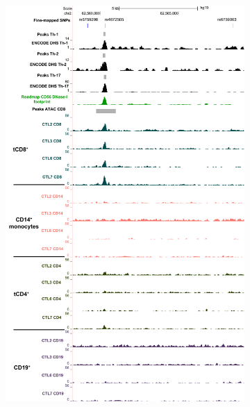 \begin{figure}[htbp]
\centering
\begin{subfigure}{0.5\textwidth}
\centering
\includegraphics[width=\textwidth]{./Results2/pdfs/chr2p15_rs4672505_FM_all_cell_types_track_all_marks}
\caption{\textbf{}}
\end{subfigure}%
\begin{subfigure}{0.5\textwidth}
\centering

\end{subfigure}
\end{figure}
